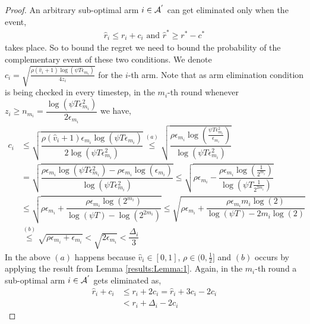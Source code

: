 \begin{proof}
An arbitrary sub-optimal arm ${i}\in \mathcal{A}^{'}$ can get eliminated only when the event,
	\begin{align}
	\hat{r}_{i} \leq r_{i} + c_{i} \text{ and } \label{eq:armelim-casea}
 	\hat{r}^{*} \geq r^{*} - c^{*}
	\end{align}
takes place. So to bound the regret we need to bound the probability of the complementary event of these two conditions. We denote $c_{i} = \sqrt{\frac{\rho (\hat{v}_i + 1) \log (\psi T\epsilon_{m_{i}})}{4 z_{i}}}$ for the $i$-th arm. Note that as arm elimination condition is being checked in every timestep, in the $m_i$-th round whenever $z_i\geq n_{m_{i}}=\dfrac{\log{(\psi T\epsilon_{m_{i}}^{2})}}{2\epsilon_{m_{i}}}$ we have, 
	\begin{align*}
	c_{i} &\leq \sqrt{\dfrac{\rho (\hat{v}_i + 1)\epsilon_{m_{i}}\log (\psi T\epsilon_{m_{i}})}{2\log(\psi T\epsilon_{m_{i}}^{2})}} \overset{(a)}{\leq} \sqrt{\dfrac{\rho\epsilon_{m_{i}}\log (\frac{\psi T\epsilon_{m_{i}}^{2}}{\epsilon_{m_{i}}})}{\log(\psi T\epsilon_{m_{i}}^{2})}} \\
	& = \sqrt{\dfrac{\rho\epsilon_{m_{i}}\log (\psi T\epsilon_{m_{i}}^{2}) - \rho\epsilon_{m_{i}}\log (\epsilon_{m_{i}})}{\log(\psi T\epsilon_{m_{i}}^{2})}} 
	\leq  \sqrt{\rho\epsilon_{m_{i}} - \dfrac{\rho\epsilon_{m_i}\log(\frac{1}{2^{m_i}})}{\log(\psi T \frac{1}{2^{2m_i}})}} \\
	&\leq \sqrt{\rho\epsilon_{m_{i}} + \dfrac{\rho\epsilon_{m_i}\log(2^{m_i})}{\log(\psi T) - \log( 2^{2m_i})}}  \leq \sqrt{\rho\epsilon_{m_{i}} + \dfrac{\rho\epsilon_{m_i}m_i \log(2)}{\log(\psi T) - 2m_i\log( 2)}} \\ 
	 & \overset{(b)}{\leq} \sqrt{\rho\epsilon_{m_{i}} + \epsilon_{m_i}} 
	  < \sqrt{2\epsilon_{m_i}} 
	  < \dfrac{\Delta_{i}}{3} 
	\end{align*}
In the above $(a)$ happens because $\hat{v}_i \in [0,1]$, $\rho \in (0,\frac{1}{2}]$ and $(b)$ occurs by applying the result from Lemma \ref{results:Lemma:1}.
Again, in the $m_i$-th round a sub-optimal arm ${i} \in \mathcal{A}^{'}$ gets eliminated as, 
  \begin{align*}
\hat{r}_{i} + c_{i}&\leq r_{i} + 2c_{i} 
= \hat{r}_{i} + 3c_{i} - 2c_{i} \\
 &< r_{i} + \Delta_{i} - 2c_{i}

\end{align*}
\end{proof}
